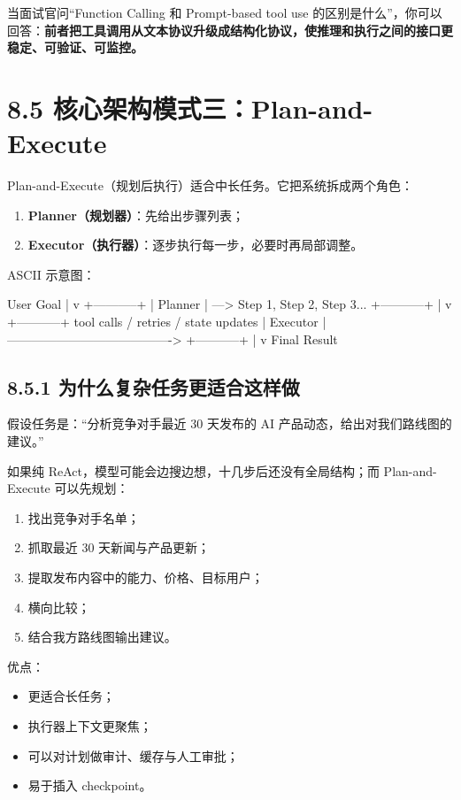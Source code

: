 当面试官问``Function Calling 和 Prompt-based tool use 的区别是什么''，你可以回答：\textbf{前者把工具调用从文本协议升级成结构化协议，使推理和执行之间的接口更稳定、可验证、可监控。}


\section{8.5 核心架构模式三：Plan-and-Execute}

Plan-and-Execute（规划后执行）适合中长任务。它把系统拆成两个角色：


\begin{enumerate}[leftmargin=2em]
\item \textbf{Planner（规划器）}：先给出步骤列表；
\item \textbf{Executor（执行器）}：逐步执行每一步，必要时再局部调整。
\end{enumerate}

ASCII 示意图：


\begin{codeblock}
User Goal
   |
   v
+-----------+
|  Planner  | ---> Step 1, Step 2, Step 3...
+-----------+
   |
   v
+-----------+    tool calls / retries / state updates
| Executor  | ---------------------------------------->
+-----------+
   |
   v
 Final Result
\end{codeblock}

\subsection{8.5.1 为什么复杂任务更适合这样做}

假设任务是：``分析竞争对手最近 30 天发布的 AI 产品动态，给出对我们路线图的建议。''


如果纯 ReAct，模型可能会边搜边想，十几步后还没有全局结构；而 Plan-and-Execute 可以先规划：


\begin{enumerate}[leftmargin=2em]
\item 找出竞争对手名单；
\item 抓取最近 30 天新闻与产品更新；
\item 提取发布内容中的能力、价格、目标用户；
\item 横向比较；
\item 结合我方路线图输出建议。
\end{enumerate}

优点：


\begin{itemize}[leftmargin=2em]
\item 更适合长任务；
\item 执行器上下文更聚焦；
\item 可以对计划做审计、缓存与人工审批；
\item 易于插入 checkpoint。
\end{itemize}

